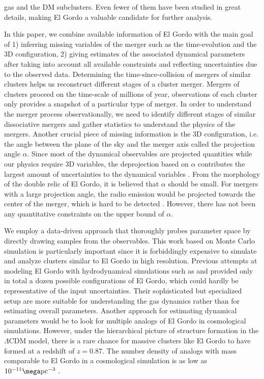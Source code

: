 gas and the DM subclusters. Even fewer of them have been studied in
great details, making El Gordo a valuable candidate for further analysis.
\par 
In this paper, we combine available information of El Gordo with the main
goal of 1) inferring missing variables of the merger
such as the time-evolution and the 3D configuration, 2) giving estimates of
the associated dynamical parameters after taking into account all available
constraints and reflecting uncertainties due to the observed data.
Determining the time-since-collision of mergers of similar clusters helps
us reconstruct different stages of a cluster merger.
Mergers of clusters proceed on the time-scale of millions of year,
observations of each cluster only provides a snapshot of a particular type
of merger. In order to understand the merger process observationally, 
we need to identify different stages of similar dissociative mergers and
gather statistics to understand the physics of the mergers.  
Another crucial piece of missing information is the 3D
configuration, i.e. the angle between the plane of the sky and the merger
axis called the projection angle $\alpha$. Since most of the dynamical
observables are projected quantities while our physics require 3D
variables, the deprojection based on $\alpha$ contributes the
largest amount of uncertainties to the dynamical variables .
From the morphology of the double relic of El Gordo, it is believed that
$\alpha$ should be small. For  mergers with a
large projection angle, the radio emission would be projected towards the
center of the merger, which is hard to be detected \citep{Vazza11}.
However, there has not been any quantitative constraints on the upper bound of $\alpha$.  
\par 
We employ a data-driven approach that thoroughly probes parameter
space by directly drawing samples from the observables. 
This work based on Monte Carlo simulation is particularly important since
it is forbiddingly expensive to simulate and analyze clusters similar to El
Gordo in high resolution. Previous attempts at modeling El Gordo with hydrodynamical
simulations such as \cite{Donnert13} and \cite{Molnar14} provided only in
total a dozen possible configurations of El Gordo, which could hardly be
representative of the input uncertainties. Their sophisticated but
specialized setup are more suitable for understanding the gas dynamics
rather than for estimating overall parameters. Another approach for
estimating dynamical parameters
would be to look for multiple analogs of El Gordo in cosmological
simulations.  However, under the hierarchical picture
of structure formation in the $\Lambda$CDM model, there is a rare chance
for massive clusters like El Gordo to have formed at a redshift of $z = 0.87$.  
The number density of analogs with mass comparable to El Gordo in a
cosmological simulation is as low as $10^{-11} \mega\text{pc}^{-3}$ .  
\par

